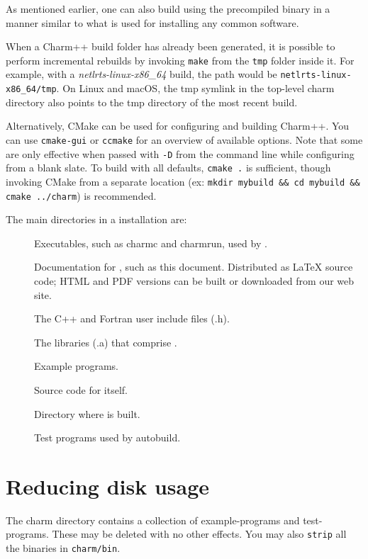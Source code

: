 As mentioned earlier, one can also build \charmpp{} using the precompiled binary
in a manner similar to what is used for installing any common software.

When a Charm++ build folder has already been generated, it is possible to
perform incremental rebuilds by invoking \verb|make| from the \verb|tmp| folder
inside it. For example, with a {\em netlrts-linux-x86\_64} build, the path
would be \verb|netlrts-linux-x86_64/tmp|. On Linux and macOS, the tmp symlink
in the top-level charm directory also points to the tmp directory of the most
recent build.

Alternatively, CMake can be used for configuring and building Charm++. You can
use \verb|cmake-gui| or \verb|ccmake| for an overview of available options.
Note that some are only effective when passed with \verb|-D| from the
command line while configuring from a blank slate. To build with all defaults,
\verb|cmake .| is sufficient, though invoking CMake from a separate location
(ex: \verb|mkdir mybuild && cd mybuild && cmake ../charm|) is recommended.

The main directories in a \charmpp{} installation are:

\begin{description}
\item[]
Executables, such as charmc and charmrun,
used by \charmpp{}.

\item[]
Documentation for \charmpp{}, such as this
document.  Distributed as LaTeX source code; HTML and PDF versions
can be built or downloaded from our web site.

\item[]
The \charmpp{} C++ and Fortran user include files (.h).

\item[]
The libraries (.a) that comprise \charmpp{}.

\item[]
Example \charmpp{} programs.

\item[]
Source code for \charmpp{} itself.

\item[]
Directory where \charmpp{} is built.


\item[]
Test \charmpp{} programs used by autobuild.

\end{description}

\section{Reducing disk usage}

The charm directory contains a collection of example-programs and
test-programs.  These may be deleted with no other effects. You may 
also {\tt strip} all the binaries in {\tt charm/bin}.





